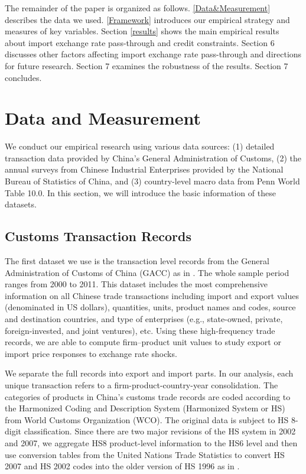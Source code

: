 \documentclass[12pt]{article}
\begin{document}
The remainder of the paper is organized as follows. \ref{Data&Measurement} describes the data we used. \ref{Framework} introduces our empirical strategy and measures of key variables. Section \ref{results} shows the main empirical results about import exchange rate pass-through and credit constraints. Section 6 discusses other factors affecting import exchange rate pass-through and directions for future research. Section 7 examines the robustness of the results. Section 7 concludes.

\section{Data and Measurement} \label{Data}

We conduct our empirical research using various data sources: (1) detailed transaction data provided by China’s General Administration of Customs, (2) the annual surveys from Chinese Industrial Enterprises provided by the National Bureau of Statistics of China, and (3) country-level macro data from Penn World Table 10.0. In this section, we will introduce the basic information of these datasets.

\subsection{Customs Transaction Records} \label{Data-Customs}

The first dataset we use is the transaction level records from the General Administration of Customs of China (GACC) as in \cite{manova-zhang2012}. The whole sample period ranges from 2000 to 2011. This dataset includes the most comprehensive information on all Chinese trade transactions including import and export values (denominated in US dollars), quantities, units, product names and codes, source and destination countries, and type of enterprises (e.g., state-owned, private, foreign-invested, and joint ventures), etc. Using these high-frequency trade records, we are able to compute firm–product unit values to study export or import price responses to exchange rate shocks. 

We separate the full records into export and import parts. In our analysis, each unique transaction refers to a firm-product-country-year consolidation. The categories of products in China's customs trade records are coded according to the Harmonized Coding and Description System (Harmonized System or HS) from World Customs Organization (WCO). The original data is subject to HS 8-digit classification. Since there are two major revisions of the HS system in 2002 and 2007, we aggregate HS8 product-level information to the HS6 level and then use conversion tables from the United Nations Trade Statistics to convert HS 2007 and HS 2002 codes into the older version of HS 1996 as in \cite{fan-li-yeaple2015}.
\end{document}
